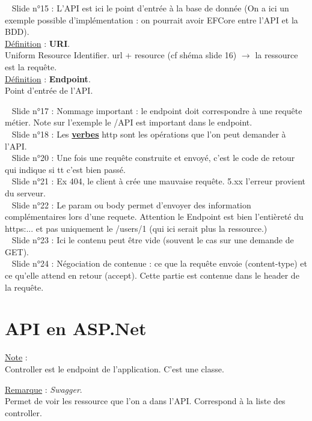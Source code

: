 \documentclass[a4paper,12pt,twoside]{article}
\newcommand{\urlcolor}{magenta}  %
\newcommand{\keycolor}{purple} %
\newcommand{\rem}[2]{\noindent\underline{Remarque} : \textit{#1}.\\ \indent #2}
\newcommand{\note}[1]{\noindent\underline{Note} : \\ \indent #1}
\newcommand{\defi}[2]{\noindent\underline{Définition} : \textbf{#1}.\\ \indent #2}
\newcommand{\slide}[2]{\textbullet ~ Slide n°#1 : \indent #2}
\newcommand{\keyref}[2]{\hypersetup{urlcolor=\keycolor} \href{#1}{\textbf{#2}}\hypersetup{urlcolor=\urlcolor}}
\begin{document}
\slide{15}{L'API est ici le point d'entrée à la base de donnée (On a ici un exemple possible d'implémentation : on pourrait avoir EFCore entre l'API et la BDD).}\\

\defi{URI}{Uniform Resource Identifier. url + resource (cf shéma slide 16) $\to$ la ressource est la requête.}\\

\defi{Endpoint}{Point d'entrée de l'API.}

\slide{17}{Nommage important : le endpoint doit correspondre à une requête métier. Note sur l'exemple le /API est important dans le endpoint.}\\

\slide{18}{Les \keyref{https://developer.mozilla.org/fr/docs/Web/HTTP/Methods}{verbes} http sont les opérations que l'on peut demander à l'API.}\\

\slide{20}{Une fois une requête construite et envoyé, c'est le code de retour qui indique si tt c'est bien passé.}\\

\slide{21}{Ex 404, le client à crée une mauvaise requête. 5.xx l'erreur provient du serveur.}\\

\slide{22}{Le param ou body permet d'envoyer des information complémentaires lors d'une requete. Attention le Endpoint est bien l'entièreté du https:... et pas uniquement le /users/1 (qui ici serait plus la ressource.)}\\

\slide{23}{Ici le contenu peut être vide (souvent le cas sur une demande de GET).}\\

\slide{24}{Négociation de contenue : ce que la requête envoie (content-type) et ce qu'elle attend en retour (accept). Cette partie est contenue dans le header de la requête.}\\

\section{API en ASP.Net}

\note{Controller est le endpoint de l'application. C'est une classe.}

\rem{Swagger}{Permet de voir les ressource que l'on a dans l'API. Correspond à la liste des controller.}\\
\end{document}

